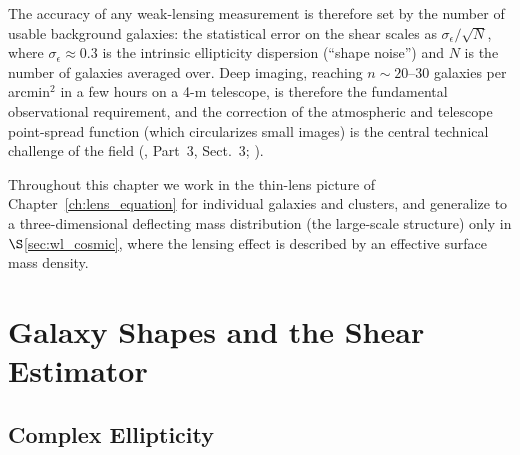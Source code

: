 The accuracy of any weak-lensing measurement is therefore set by the
number of usable background galaxies: the statistical error on the shear
scales as $\sigma_\epsilon/\sqrt{N}$, where $\sigma_\epsilon \approx 0.3$
is the intrinsic ellipticity dispersion (``shape noise'') and $N$ is the
number of galaxies averaged over.  Deep imaging, reaching
$n \sim 20$--$30$ galaxies per arcmin$^2$ in a few hours on a 4-m
telescope, is therefore the fundamental observational requirement, and
the correction of the atmospheric and telescope point-spread function
(which circularizes small images) is the central technical challenge of
the field
(\citealp{schneider_kochanek_wambsganss_2006}, Part~3, Sect.~3;
\citealp{bartelmann_schneider_2001}).

Throughout this chapter we work in the thin-lens picture of
Chapter~\ref{ch:lens_equation} for individual galaxies and clusters, and
generalize to a three-dimensional deflecting mass distribution (the
large-scale structure) only in $\S$\ref{sec:wl_cosmic}, where the
lensing effect is described by an effective surface mass density.


\section{Galaxy Shapes and the Shear Estimator}
\label{sec:wl_shapes}

\subsection{Complex Ellipticity}


